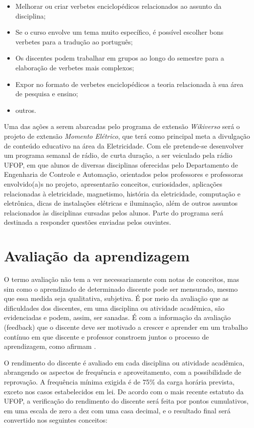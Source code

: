 \documentclass[
	12pt,				%
	openright,			%
	oneside,			%
	a4paper,			%
	english,			%
	brazil				%
	]{abntex2}
\begin{document}
\begin{itemize}
    \item Melhorar ou criar verbetes enciclopédicos relacionados ao assunto da disciplina;
    \item Se o curso envolve um tema muito específico, é possível escolher bons verbetes para a tradução ao português;
    \item Os discentes podem trabalhar em grupos ao longo do semestre para a elaboração de verbetes mais complexos;
    \item Expor no formato de verbetes enciclopédicos a teoria relacionada à sua área de pesquisa e ensino;
    \item outros.
\end{itemize}

Uma das ações a serem abarcadas pelo programa de extensão \textit{Wikiverso} será o projeto de extensão \textit{Momento Elétrico}, que terá como principal meta a divulgação de conteúdo educativo na área da Eletricidade. Com ele pretende-se desenvolver um programa semanal de rádio, de curta duração, a ser veiculado pela rádio UFOP, em que alunos de diversas disciplinas oferecidas pelo Departamento de Engenharia de Controle e Automação, orientados pelos professores e professoras envolvido(a)s no projeto, apresentarão conceitos, curiosidades, aplicações relacionadas à eletricidade, magnetismo, história da eletricidade, computação e eletrônica, dicas de instalações elétricas e iluminação, além de outros assuntos relacionados às disciplinas cursadas pelos alunos. Parte do programa será destinada a responder questões enviadas pelos ouvintes.


\chapter{Avaliação da aprendizagem}
\label{cap:06} 
%
O termo avaliação não tem a ver necessariamente com notas de conceitos, mas sim como o aprendizado de determinado discente pode ser mensurado, mesmo que essa medida seja qualitativa, subjetiva. É por meio da avaliação que as dificuldades dos discentes, em uma disciplina ou atividade acadêmica, são evidenciadas e podem, assim, ser sanadas. É com a informação da avaliação (feedback) que o discente deve ser motivado a crescer e aprender em um trabalho contínuo em que discente e professor constroem juntos o processo de aprendizagem, como afirmam \textcite{gaeta}.

O rendimento do discente é avaliado em cada disciplina ou atividade acadêmica, abrangendo os aspectos de frequência e aproveitamento, com a possibilidade de reprovação. A frequência mínima exigida é de 75\% da carga horária prevista, exceto nos casos estabelecidos em lei. De acordo com o mais recente estatuto da UFOP, a verificação do rendimento do discente será feita por pontos cumulativos, em uma escala de zero a dez com uma casa decimal, e o resultado final será convertido nos seguintes conceitos:
\end{document}

